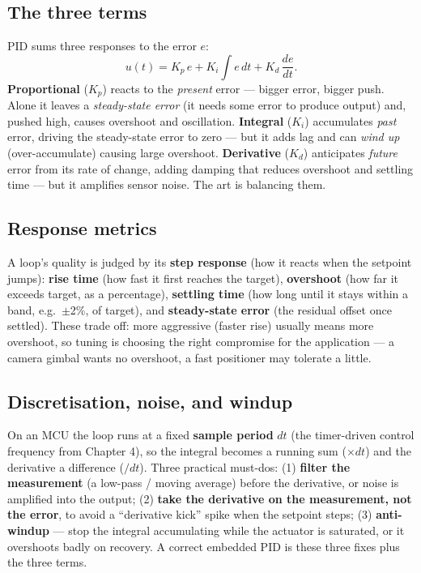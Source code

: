\subsection{The three terms}

PID sums three responses to the error $e$:
\[
u(t) = K_p\,e + K_i\!\int e\,dt + K_d\,\frac{de}{dt}.
\]
\textbf{Proportional} ($K_p$) reacts to the \emph{present} error --- bigger
error, bigger push. Alone it leaves a \emph{steady-state error} (it needs some
error to produce output) and, pushed high, causes overshoot and oscillation.
\textbf{Integral} ($K_i$) accumulates \emph{past} error, driving the
steady-state error to zero --- but it adds lag and can \emph{wind up}
(over-accumulate) causing large overshoot. \textbf{Derivative} ($K_d$)
anticipates \emph{future} error from its rate of change, adding damping that
reduces overshoot and settling time --- but it amplifies sensor noise. The art
is balancing them.

\subsection{Response metrics}

A loop's quality is judged by its \textbf{step response} (how it reacts when the
setpoint jumps): \textbf{rise time} (how fast it first reaches the target),
\textbf{overshoot} (how far it exceeds target, as a percentage),
\textbf{settling time} (how long until it stays within a band, e.g.\ $\pm$2\%,
of target), and \textbf{steady-state error} (the residual offset once settled).
These trade off: more aggressive (faster rise) usually means more overshoot, so
tuning is choosing the right compromise for the application --- a camera gimbal
wants no overshoot, a fast positioner may tolerate a little.

\subsection{Discretisation, noise, and windup}

On an MCU the loop runs at a fixed \textbf{sample period} $dt$ (the timer-driven
control frequency from Chapter 4), so the integral becomes a running sum
($\times dt$) and the derivative a difference ($/dt$). Three practical
must-dos: (1) \textbf{filter the measurement} (a low-pass / moving average)
before the derivative, or noise is amplified into the output; (2) \textbf{take
the derivative on the measurement, not the error}, to avoid a ``derivative
kick'' spike when the setpoint steps; (3) \textbf{anti-windup} --- stop the
integral accumulating while the actuator is saturated, or it overshoots badly on
recovery. A correct embedded PID is these three fixes plus the three terms.

